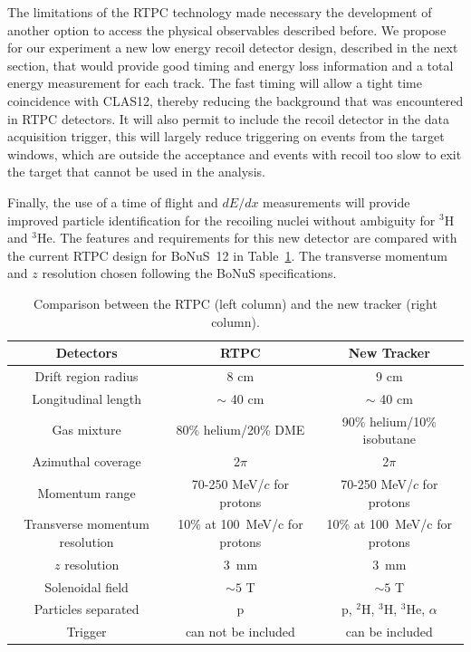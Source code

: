 The limitations of the RTPC technology made necessary the development of 
another option to access the physical observables described before. We propose 
for our experiment a new low energy recoil detector design, described in the 
next section, that would provide good timing and energy loss information and a 
total energy measurement for each track. The fast timing will allow a tight 
time coincidence with CLAS12, thereby reducing the background that was 
encountered in RTPC detectors. It will also permit to include the recoil 
detector in the data acquisition trigger, this will largely reduce triggering 
on events from the target windows, which are outside the acceptance and events 
with recoil too slow to exit the target that cannot be used in the analysis. 


Finally, the use of a time of flight and $dE/dx$ measurements will provide 
improved particle identification for the recoiling nuclei without ambiguity for 
$^3$H and $^3$He. The features and requirements for this new detector are 
compared with the current RTPC design for BoNuS~12 in Table~\ref{tab:comp}. The 
transverse momentum and $z$ resolution chosen following the BoNuS 
specifications.

\begin{table}[ht!]
\caption{\label{tab:comp}Comparison between the RTPC (left column) and the new tracker (right column).}
\begin{tabular}{|c|c|c|}
\hline
\textbf{Detectors}  & \textbf{RTPC}        & \textbf{New Tracker}\\
\hline
Drift region radius & 8 cm                & 9 cm\\
\hline
Longitudinal length & $\sim$ 40 cm         & $\sim$ 40 cm \\
\hline
Gas mixture         & 80\% helium/20\% DME & 90\% helium/10\% isobutane \\
\hline
Azimuthal coverage  & 2$\pi$               & 2$\pi$\\
\hline
Momentum range      & 70-250 MeV/$c$ for protons & 70-250 MeV/$c$ for protons\\
\hline
Transverse momentum resolution & 10\% at 100~MeV/c for protons & 10\% at 100~MeV/c for protons\\
\hline
$z$ resolution & 3~mm & 3~mm \\
\hline
Solenoidal field    & $\sim 5$ T           & $\sim 5$ T \\
\hline
Particles separated & p                    & p, $^2$H, $^3$H, $^3$He, $\alpha$ \\
\hline
Trigger             & can not be included  & can be included \\
\hline
\end{tabular}
\end{table}

